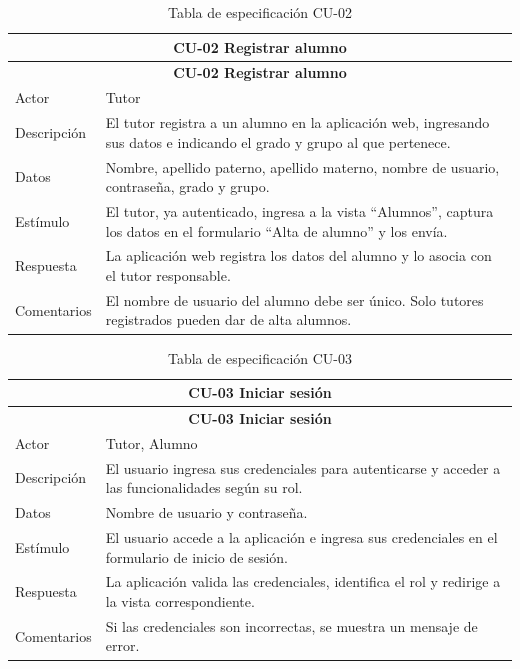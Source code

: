 \begin{longtable}{|p{4cm}|p{11cm}|}
\caption{Tabla de especificación CU-02}
\label{tab:cu02} \\

\hline
\multicolumn{2}{|c|}{\textbf{CU-02 Registrar alumno}} \\
\hline
\endfirsthead

\hline
\multicolumn{2}{|c|}{\textbf{CU-02 Registrar alumno}} \\
\hline
\endhead

\hline
\endfoot
\endlastfoot

Actor & Tutor \\
\hline
Descripción & El tutor registra a un alumno en la aplicación web, ingresando sus datos e indicando el grado y grupo al que pertenece. \\
\hline
Datos & Nombre, apellido paterno, apellido materno, nombre de usuario, contraseña, grado y grupo. \\
\hline
Estímulo & El tutor, ya autenticado, ingresa a la vista ``Alumnos'', captura los datos en el formulario ``Alta de alumno'' y los envía. \\
\hline
Respuesta & La aplicación web registra los datos del alumno y lo asocia con el tutor responsable. \\
\hline
Comentarios & El nombre de usuario del alumno debe ser único. Solo tutores registrados pueden dar de alta alumnos. \\
\hline

\end{longtable}


\begin{longtable}{|p{4cm}|p{11cm}|}
\caption{Tabla de especificación CU-03}
\label{tab:cu03} \\

\hline
\multicolumn{2}{|c|}{\textbf{CU-03 Iniciar sesión}} \\
\hline
\endfirsthead

\hline
\multicolumn{2}{|c|}{\textbf{CU-03 Iniciar sesión}} \\
\hline
\endhead

\hline
\endfoot
\endlastfoot

Actor & Tutor, Alumno \\
\hline
Descripción & El usuario ingresa sus credenciales para autenticarse y acceder a las funcionalidades según su rol. \\
\hline
Datos & Nombre de usuario y contraseña. \\
\hline
Estímulo & El usuario accede a la aplicación e ingresa sus credenciales en el formulario de inicio de sesión. \\
\hline
Respuesta & La aplicación valida las credenciales, identifica el rol y redirige a la vista correspondiente. \\
\hline
Comentarios & Si las credenciales son incorrectas, se muestra un mensaje de error. \\
\hline

\end{longtable}

